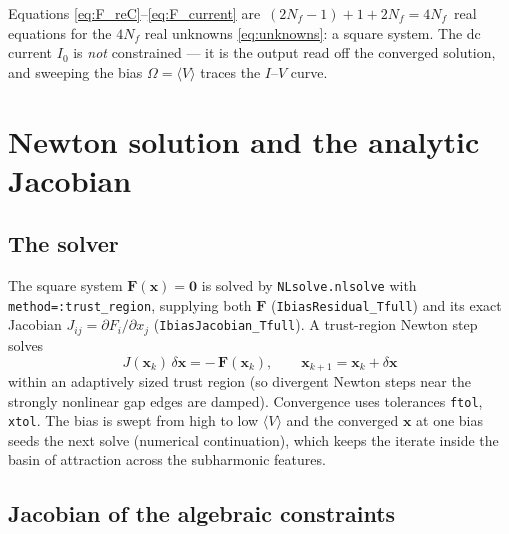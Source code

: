 \documentclass[11pt,a4paper]{article}
\newcommand{\Om}{\Omega}
\begin{document}
Equations \eqref{eq:F_reC}--\eqref{eq:F_current} are $\,(2N_f-1)+1+2N_f=4N_f\,$
real equations for the $4N_f$ real unknowns \eqref{eq:unknowns}: a square system.
The dc current $I_0$ is \emph{not} constrained --- it is the output read off the
converged solution, and sweeping the bias $\Om=\langle V\rangle$ traces the
$I$--$V$ curve.

\section{Newton solution and the analytic Jacobian}
\label{sec:jacobian}

\subsection{The solver}

The square system $\mathbf F(\mathbf x)=\mathbf 0$ is solved by
\texttt{NLsolve.nlsolve} with \texttt{method=:trust\_region}, supplying both
$\mathbf F$ (\texttt{IbiasResidual\_Tfull}) and its exact Jacobian
$J_{ij}=\partial F_i/\partial x_j$ (\texttt{IbiasJacobian\_Tfull}).  A trust-region Newton
step solves
\begin{equation}
  J(\mathbf x_k)\,\delta\mathbf x = -\,\mathbf F(\mathbf x_k),
  \qquad
  \mathbf x_{k+1} = \mathbf x_k + \delta\mathbf x
\end{equation}
within an adaptively sized trust region (so divergent Newton steps near the
strongly nonlinear gap edges are damped).  Convergence uses tolerances
\texttt{ftol}, \texttt{xtol}.  The bias is swept from high to low
$\langle V\rangle$ and the converged $\mathbf x$ at one bias seeds the next solve
(numerical continuation), which keeps the iterate inside the basin of attraction
across the subharmonic features.

\subsection{Jacobian of the algebraic constraints}
\end{document}
